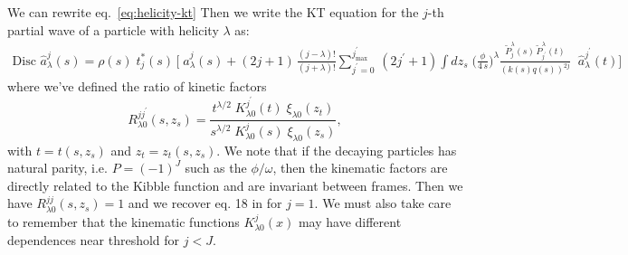 \documentclass[10pt, aps,prd,amsmath,amssymb,superscriptaddress,onecolumn,
nofootinbib,showpacs,preprintnumbers]{revtex4-1}
\newcommand{\jpmax}{{j^\prime_\text{max}}}
\newcommand{\Disc}{\text{Disc }}
\begin{document}
We can rewrite eq.~\ref{eq:helicity-kt}
Then we write the KT equation for the \(j\)-th partial wave of a particle with helicity \(\lambda\) as:
\begin{align}
  \label{eq:helicity-kt}
  \Disc \hat{a}^j_\lambda(s) = \rho(s) \; t^*_{j}(s) \, \bigg[ \; \hat{a}^j_\lambda(s) + (2j+1) \, \frac{(j-\lambda)!}{(j+\lambda)!} \sum_{j^\prime = 0}^\jpmax \, (2j^\prime+1)
  \int dz_s\;
  \bigg(  \frac{\phi}{4 \, s}\bigg)^\lambda \frac{\tilde{P}^\lambda_j(s) \, \tilde{P}_{j^\prime}^\lambda(t)}{(k(s)q(s))^{2j}} \;  \; \hat{a}^{j^\prime}_\lambda(t)\bigg]
\end{align}
where we've defined the ratio of kinetic factors
  \begin{equation}
    R^{jj^\prime}_{\lambda0}(s,z_s) = \frac{{t}^{\lambda/2}
    \; K^{j^\prime}_{\lambda0}(t) \; \xi_{\lambda0}(z_t)}{s^{\lambda/2} \; K^j_{\lambda0}(s) \;\xi_{\lambda0}(z_s)},
  \end{equation}
with \(t = t(s,z_s)\) and \(z_t = z_t(s,z_s)\). We note that if the decaying particles has natural parity, i.e. \(P = (-1)^J\) such as the \(\phi/\omega\), then the kinematic factors are directly related to the Kibble function and are invariant between frames. Then we have \(R^{jj}_{\lambda0}(s,z_s) = 1\) and we recover eq. 18 in \cite{Danilkin:2014cra} for \(j=1\). We must also take care to remember that the kinematic functions \(K^j_{\lambda0}(x)\) may have different dependences near threshold for \(j < J\).

\end{document}
